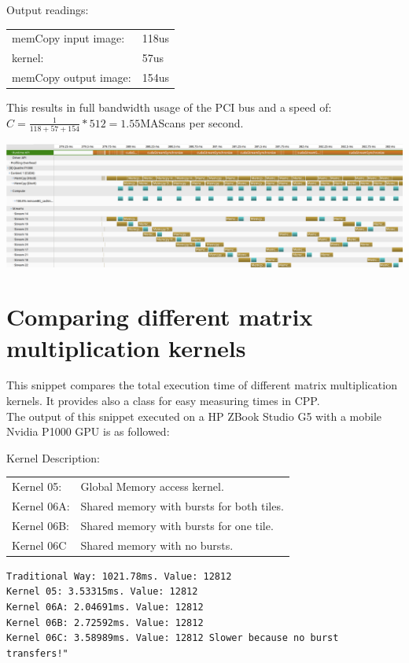 Output readings:\\
\begin{tabular}{ll}
	memCopy input image: & 118us\\
	kernel: & 57us\\
	memCopy output image: & 154us
\end{tabular}

This results in full bandwidth usage of the PCI bus and a speed of: $C = \frac{1}{118+57+154} * 512 = 1.55$MAScans per second. 

\includegraphics[width=\textwidth]{imgs/CudaStreamerFast.png}
\cite[CUDA Programming Guide, chapter 3.2.5.5ff]{cudaGuide}
\pagebreak

\section{Comparing different matrix multiplication kernels}
This snippet compares the total execution time of different matrix multiplication kernels. It provides also a class for easy measuring times in CPP.\\

The output of this snippet executed on a HP ZBook Studio G5 with a mobile Nvidia P1000 GPU is as followed:

Kernel Description:\\
\begin{tabular}{ll}
	Kernel 05: & Global Memory access kernel.\\
	Kernel 06A: & Shared memory with bursts for both tiles.\\
	Kernel 06B: & Shared memory with bursts for one tile.\\
	Kernel 06C & Shared memory with no bursts.\\
\end{tabular}


\texttt{Traditional Way: 1021.78ms. Value: 12812\\
	Kernel 05: 3.53315ms. Value: 12812\\
	Kernel 06A: 2.04691ms. Value: 12812\\
	Kernel 06B: 2.72592ms. Value: 12812\\
	Kernel 06C: 3.58989ms. Value: 12812 Slower because no burst transfers!"\\
}

